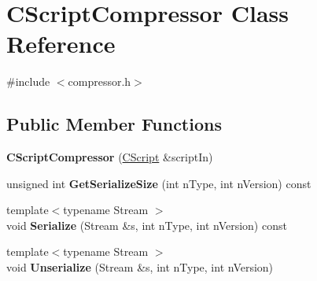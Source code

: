 \hypertarget{class_c_script_compressor}{}\section{C\+Script\+Compressor Class Reference}
\label{class_c_script_compressor}


{\ttfamily \#include $<$compressor.\+h$>$}

\subsection*{Public Member Functions}
\begin{DoxyCompactItemize}
\item 
\mbox{\label{class_c_script_compressor_aad31afe3d14387b163b5c043e834ca2b}} 
{\bfseries C\+Script\+Compressor} (\mbox{\hyperlink{class_c_script}{C\+Script}} \&script\+In)
\item 
\mbox{\label{class_c_script_compressor_afd6f2bea6c0ba2d34f770997e96bc23d}} 
unsigned int {\bfseries Get\+Serialize\+Size} (int n\+Type, int n\+Version) const
\item 
\mbox{\label{class_c_script_compressor_a5702b644df500ddd11c56d0490e8be44}} 
{\footnotesize template$<$typename Stream $>$ }\\void {\bfseries Serialize} (Stream \&s, int n\+Type, int n\+Version) const
\item 
\mbox{\label{class_c_script_compressor_a016fa6e3d2735d95fcf773271da073d5}} 
{\footnotesize template$<$typename Stream $>$ }\\void {\bfseries Unserialize} (Stream \&s, int n\+Type, int n\+Version)
\end{DoxyCompactItemize}
